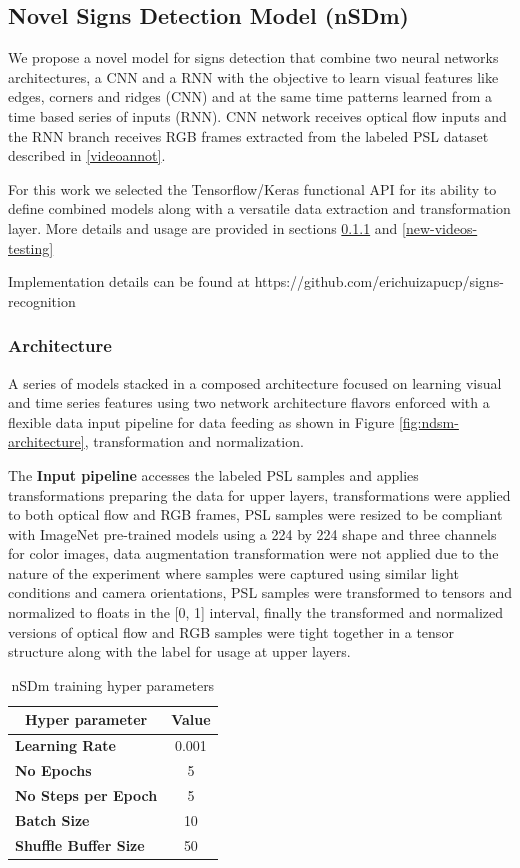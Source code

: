 \documentclass[twocolumn,conference]{article}
\begin{document}
\subsection{Novel Signs Detection Model (nSDm)}\label{nsdm}
We propose a novel model for signs detection that combine two neural networks architectures, a CNN and a RNN with the objective to learn visual features like edges, corners and ridges (CNN) and at the same time patterns learned from a time based series of inputs (RNN). CNN network receives optical flow inputs and the RNN branch receives RGB frames extracted from the labeled PSL dataset described in \ref{videoannot}.

For this work we selected the Tensorflow/Keras functional API for its ability to define combined models along with a versatile data extraction and transformation layer. More details and usage are provided in sections \ref{nsdm-architecture} and \ref{new-videos-testing}

Implementation details can be found at https://github.com/erichuizapucp/signs-recognition
\subsubsection{Architecture}\label{nsdm-architecture}
A series of models stacked in a composed architecture focused on learning visual and time series features using two network architecture flavors enforced with a flexible data input pipeline for data feeding as shown in Figure \ref{fig:ndsm-architecture}, transformation and normalization. 

The \textbf{Input pipeline} accesses the labeled PSL samples and applies transformations preparing the data for upper layers, transformations were applied to both optical flow and RGB frames, PSL samples were resized to be compliant with ImageNet pre-trained models using a 224 by 224 shape and three channels for color images, data augmentation transformation were not applied due to the nature of the experiment where samples were captured using similar light conditions and camera orientations, PSL samples were transformed to tensors and normalized to floats in the [0, 1] interval, finally the transformed and normalized versions of optical flow and RGB samples were tight together in a tensor structure along with the label for usage at upper layers.
\begin{table}[!htb]
\captionsetup{size=footnotesize}
\begin{tabular}{ p{16em} c}
\toprule
\multicolumn{1}{c}{\textbf{Hyper parameter}} & 
	\multicolumn{1}{c}{\textbf{Value}}\\
\midrule
\textbf{Learning Rate}&	0.001\\
\textbf{No Epochs}&	5\\
\textbf{No Steps per Epoch}&	5\\
\textbf{Batch Size}&	10\\
\textbf{Shuffle Buffer Size}&	50\\
\bottomrule
\end{tabular}
\caption{nSDm training hyper parameters} \label{tab:nSDm-hyperparams}
\end{table}
\end{document}
